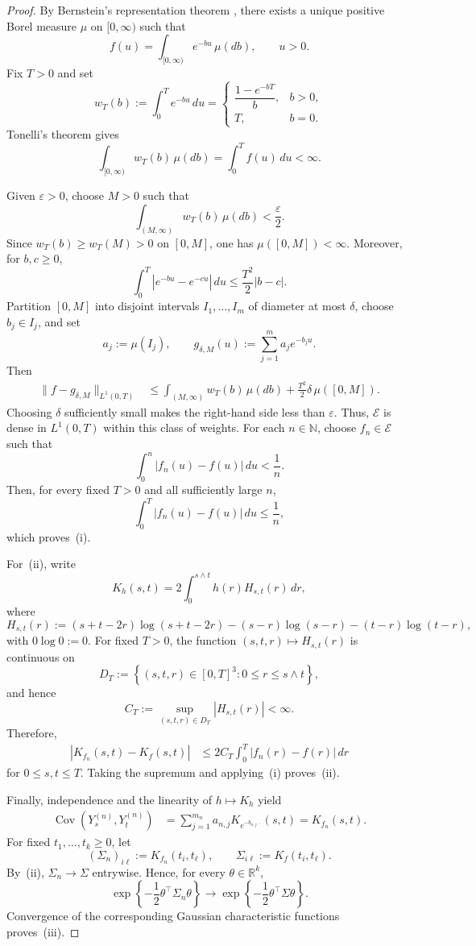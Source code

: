 \documentclass[preprint,12pt,authoryear]{elsarticle}
\begin{document}
\begin{proof}
By Bernstein's representation theorem
\citep[Theorem~1.4]{SchillingSongVondracek2010}, there exists a unique
positive Borel measure \(\mu\) on \([0,\infty)\) such that
\[
f(u)
=
\int_{[0,\infty)}e^{-bu}\,\mu(db),
\qquad u>0.
\]
Fix \(T>0\) and set
\[
w_T(b)
:=
\int_0^T e^{-bu}\,du
=
\begin{cases}
\dfrac{1-e^{-bT}}{b}, & b>0,\\[5pt]
T, & b=0.
\end{cases}
\]
Tonelli's theorem gives
\[
\int_{[0,\infty)}w_T(b)\,\mu(db)
=
\int_0^T f(u)\,du
<\infty.
\]

Given \(\varepsilon>0\), choose \(M>0\) such that
\[
\int_{(M,\infty)}w_T(b)\,\mu(db)<\frac{\varepsilon}{2}.
\]
Since \(w_T(b)\geq w_T(M)>0\) on \([0,M]\), one has
\(\mu([0,M])<\infty\). Moreover, for \(b,c\geq0\),
\[
\int_0^T|e^{-bu}-e^{-cu}|\,du
\leq
\frac{T^2}{2}|b-c|.
\]
Partition \([0,M]\) into disjoint intervals
\(I_1,\ldots,I_m\) of diameter at most \(\delta\), choose
\(b_j\in I_j\), and set
\[
a_j:=\mu(I_j),
\qquad
g_{\delta,M}(u)
:=
\sum_{j=1}^m a_j e^{-b_j u}.
\]
Then
\[
\begin{aligned}
\|f-g_{\delta,M}\|_{L^1(0,T)}
&\leq
\int_{(M,\infty)}w_T(b)\,\mu(db)
+
\frac{T^2}{2}\delta\,\mu([0,M]).
\end{aligned}
\]
Choosing \(\delta\) sufficiently small makes the right-hand side less
than \(\varepsilon\). Thus, \(\mathcal E\) is dense in \(L^1(0,T)\)
within this class of weights. For each \(n\in\mathbb N\), choose
\(f_n\in\mathcal E\) such that
\[
\int_0^n|f_n(u)-f(u)|\,du<\frac1n.
\]
Then, for every fixed \(T>0\) and all sufficiently large \(n\),
\[
\int_0^T|f_n(u)-f(u)|\,du
\leq\frac1n,
\]
which proves~(i).

For~(ii), write
\[
K_h(s,t)
=
2\int_0^{s\wedge t}h(r)H_{s,t}(r)\,dr,
\]
where
\[
H_{s,t}(r)
:=
(s+t-2r)\log(s+t-2r)
-(s-r)\log(s-r)
-(t-r)\log(t-r),
\]
with \(0\log0:=0\). For fixed \(T>0\), the function
\((s,t,r)\mapsto H_{s,t}(r)\) is continuous on
\[
D_T
:=
\left\{
(s,t,r)\in[0,T]^3:
0\leq r\leq s\wedge t
\right\},
\]
and hence
\[
C_T
:=
\sup_{(s,t,r)\in D_T}|H_{s,t}(r)|
<\infty.
\]
Therefore,
\[
\begin{aligned}
|K_{f_n}(s,t)-K_f(s,t)|
&\leq
2C_T\int_0^T|f_n(r)-f(r)|\,dr
\end{aligned}
\]
for \(0\leq s,t\leq T\). Taking the supremum and applying~(i)
proves~(ii).

Finally, independence and the linearity of \(h\mapsto K_h\) yield
\[
\begin{aligned}
\operatorname{Cov}(Y^{(n)}_s,Y^{(n)}_t)
&=
\sum_{j=1}^{m_n}
a_{n,j}K_{e^{-b_{n,j}\,\cdot}}(s,t)
=
K_{f_n}(s,t).
\end{aligned}
\]
For fixed \(t_1,\ldots,t_k\geq0\), let
\[
(\Sigma_n)_{i\ell}
:=
K_{f_n}(t_i,t_\ell),
\qquad
\Sigma_{i\ell}
:=
K_f(t_i,t_\ell).
\]
By~(ii), \(\Sigma_n\to\Sigma\) entrywise. Hence, for every
\(\theta\in\mathbb R^k\),
\[
\exp\left\{-\frac12\theta^\top\Sigma_n\theta\right\}
\longrightarrow
\exp\left\{-\frac12\theta^\top\Sigma\theta\right\}.
\]
Convergence of the corresponding Gaussian characteristic functions
proves~(iii).
\end{proof}
\end{document}
